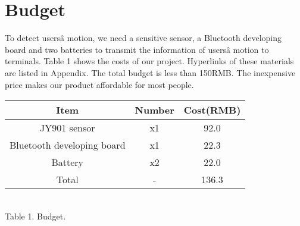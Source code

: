 \section{Budget}
To detect usersâ motion, we need a sensitive sensor, a Bluetooth developing board and two batteries to transmit the information of usersâ motion to terminals. Table 1 shows the costs of our project. Hyperlinks of these materials are listed in Appendix. The total budget is less than 150RMB. The inexpensive price makes our product affordable for most people.
\begin{center}
\begin{tabular}{|ccc|}
\hline Item&Number&Cost(RMB)\\
\hline JY901 sensor&x1&92.0\\
\hline Bluetooth developing board&x1&22.3\\
\hline Battery&x2&22.0\\
\hline Total&-&136.3\\
\hline
\end{tabular}
\vspace{0.5em}
~\\Table 1. Budget.\\
\end{center}
